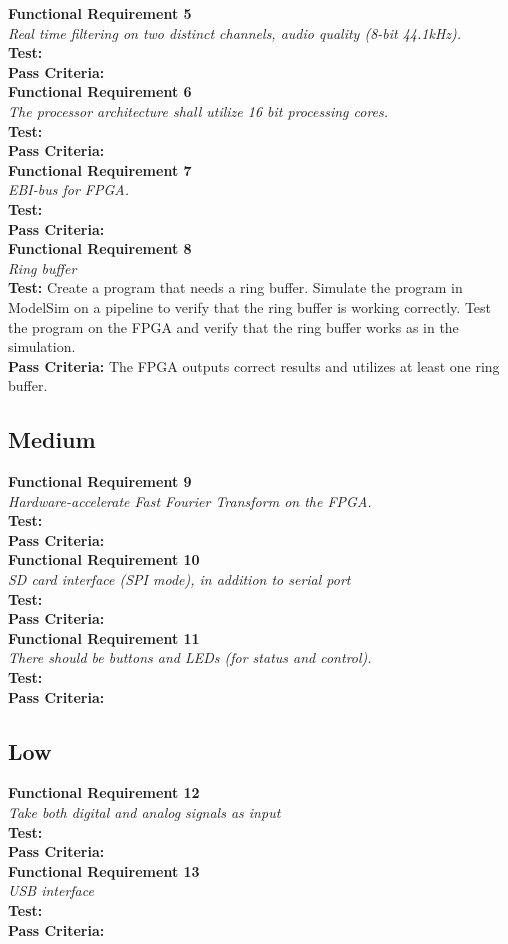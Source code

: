 \textbf{Functional Requirement 5}
\\
\textit{Real time filtering on two distinct channels, audio quality (8-bit 44.1kHz).}
\\
\textbf{Test:}
\\
\textbf{Pass Criteria:}
\\

\textbf{Functional Requirement 6}
\\
\textit{The processor architecture shall utilize 16 bit processing cores.}
\\
\textbf{Test:}
\\
\textbf{Pass Criteria:}
\\

\textbf{Functional Requirement 7}
\\
\textit{EBI-bus for FPGA.}
\\
\textbf{Test:}
\\
\textbf{Pass Criteria:}
\\

\textbf{Functional Requirement 8}
\\
\textit{Ring buffer}
\\
\textbf{Test:}
Create a program that needs a ring buffer. 
Simulate the program in ModelSim on a pipeline to verify that the ring buffer is working correctly.
Test the program on the FPGA and verify that the ring buffer works as in the simulation.
\\
\textbf{Pass Criteria:}
The FPGA outputs correct results and utilizes at least one ring buffer.
\\


\subsection{Medium}
\textbf{Functional Requirement 9}
\\
\textit{Hardware-accelerate Fast Fourier Transform on the FPGA.}
\\
\textbf{Test:}
\\
\textbf{Pass Criteria:}
\\
\textbf{Functional Requirement 10}
\\
\textit{SD card interface (SPI mode), in addition to serial port}
\\
\textbf{Test:}
\\
\textbf{Pass Criteria:}
\\
\textbf{Functional Requirement 11}
\\
\textit{There should be buttons and LEDs (for status and control).}
\\
\textbf{Test:}
\\
\textbf{Pass Criteria:}
\\


\subsection{Low}
\textbf{Functional Requirement 12}
\\
\textit{Take both digital and analog signals as input}
\\
\textbf{Test:}
\\
\textbf{Pass Criteria:}
\\
\textbf{Functional Requirement 13}
\\
\textit{USB interface}
\\
\textbf{Test:}
\\
\textbf{Pass Criteria:}
\\

